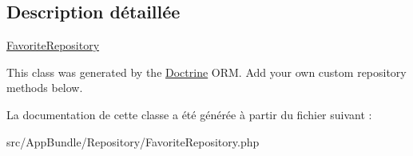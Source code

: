 \subsection{Description détaillée}
\hyperlink{classAppBundle_1_1Repository_1_1FavoriteRepository}{Favorite\+Repository}

This class was generated by the \hyperlink{namespaceAppBundle_1_1Doctrine}{Doctrine} O\+RM. Add your own custom repository methods below. 

La documentation de cette classe a été générée à partir du fichier suivant \+:\begin{DoxyCompactItemize}
\item 
src/\+App\+Bundle/\+Repository/Favorite\+Repository.\+php\end{DoxyCompactItemize}
